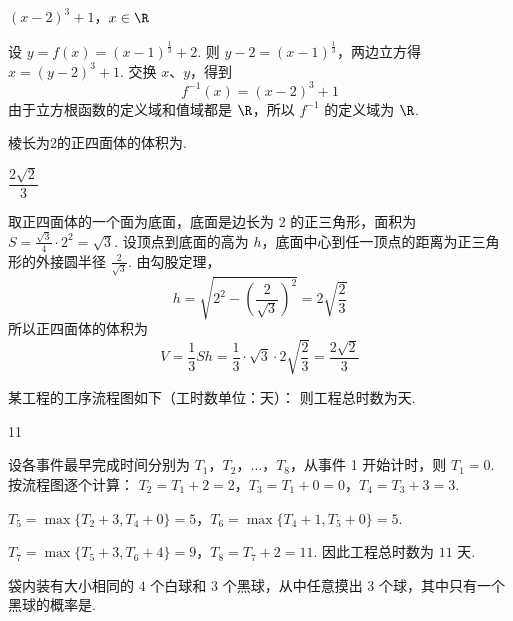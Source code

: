 \begin{answer}
\((x-2)^3+1\)，\(x\in\R\)
\end{answer}

\begin{solution}
设 \(y=f(x)=(x-1)^{\frac{1}{3}}+2\). 则
\(y-2=(x-1)^{\frac{1}{3}}\)，两边立方得 \(x=(y-2)^3+1\).
交换 \(x\)、\(y\)，得到
\[
f^{-1}(x)=(x-2)^3+1
\]
由于立方根函数的定义域和值域都是 \(\R\)，所以 \(f^{-1}\) 的定义域为 \(\R\).
\end{solution}

\begin{problem}
棱长为\(2\)的正四面体的体积为\fillinblank{}.
\end{problem}

\begin{answer}
\(\dfrac{2\sqrt{2}}{3}\)
\end{answer}

\begin{solution}
取正四面体的一个面为底面，底面是边长为 \(2\) 的正三角形，面积为
\(S=\frac{\sqrt3}{4}\cdot2^2=\sqrt3\). 设顶点到底面的高为 \(h\)，底面中心到任一顶点的距离为正三角形的外接圆半径 \(\frac{2}{\sqrt3}\). 由勾股定理，
\[
h=\sqrt{2^2-\left(\frac{2}{\sqrt3}\right)^2}=2\sqrt{\frac{2}{3}}
\]
所以正四面体的体积为
\[
V=\frac13Sh=\frac13\cdot\sqrt3\cdot2\sqrt{\frac23}=\frac{2\sqrt2}{3}
\]
\end{solution}

\begin{problem}
某工程的工序流程图如下（工时数单位：天）：
则工程总时数为\fillinblank{}\(\text{天}\).

\end{problem}

\begin{answer}
11
\end{answer}

\begin{solution}
设各事件最早完成时间分别为 \(T_1\)，\(T_2\)，\(\ldots\)，\(T_8\)，从事件 1 开始计时，则 \(T_1=0\). 按流程图逐个计算：
\(T_2=T_1+2=2\)，\(T_3=T_1+0=0\)，\(T_4=T_3+3=3\).

\(T_5=\max\{T_2+3,T_4+0\}=5\)，\(T_6=\max\{T_4+1,T_5+0\}=5\).

\(T_7=\max\{T_5+3,T_6+4\}=9\)，\(T_8=T_7+2=11\).
因此工程总时数为 \(11\) 天.
\end{solution}

\begin{problem}
袋内装有大小相同的 \(4\) 个白球和 \(3\) 个黑球，从中任意摸出 \(3\) 个球，其中只有一个黑球的概率是\fillinblank{}.
\end{problem}

